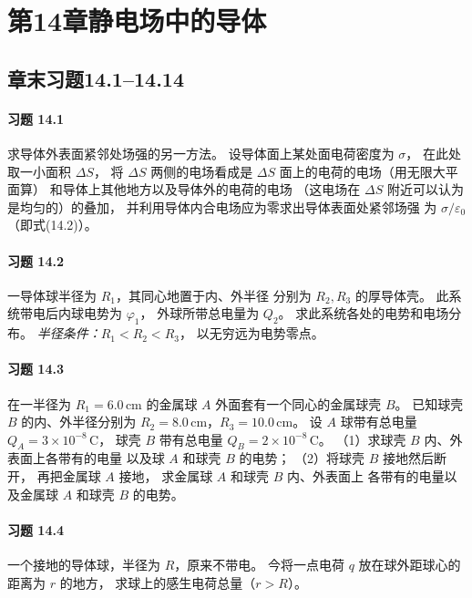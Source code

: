 \section*{第14章\quad 静电场中的导体}
\subsection*{章末习题14.1--14.14}

\paragraph{习题 14.1}
求导体外表面紧邻处场强的另一方法。
设导体面上某处面电荷密度为 \(\sigma\)，
在此处取一小面积 \(\Delta S\)，
将 \(\Delta S\) 两侧的电场看成是
\(\Delta S\) 面上的电荷的电场（用无限大平面算）
和导体上其他地方以及导体外的电荷的电场
（这电场在 \(\Delta S\) 附近可以认为是均匀的）的叠加，
并利用导体内合电场应为零求出导体表面处紧邻场强
为 \(\sigma/\varepsilon_0\)
（即式(14.2)）。

\paragraph{习题 14.2}
一导体球半径为 \(R_1\)，其同心地置于内、外半径
分别为 \(R_2,R_3\) 的厚导体壳。
此系统带电后内球电势为 \(\varphi_1\)，
外球所带总电量为 \(Q_2\)。
求此系统各处的电势和电场分布。
\textit{半径条件：}\(R_1<R_2<R_3\)，
以无穷远为电势零点。

\paragraph{习题 14.3}
在一半径为 \(R_1=6.0\,\mathrm{cm}\) 的金属球
\(A\) 外面套有一个同心的金属球壳 \(B\)。
已知球壳 \(B\) 的内、外半径分别为
\(R_2=8.0\,\mathrm{cm}\)，\(R_3=10.0\,\mathrm{cm}\)。
设 \(A\) 球带有总电量
\(Q_A=3\times10^{-8}\,\mathrm C\)，
球壳 \(B\) 带有总电量
\(Q_B=2\times10^{-8}\,\mathrm C\)。
（1）求球壳 \(B\) 内、外表面上各带有的电量
以及球 \(A\) 和球壳 \(B\) 的电势；
（2）将球壳 \(B\) 接地然后断开，
再把金属球 \(A\) 接地，
求金属球 \(A\) 和球壳 \(B\) 内、外表面上
各带有的电量以及金属球 \(A\) 和球壳 \(B\) 的电势。

\paragraph{习题 14.4}
一个接地的导体球，半径为 \(R\)，原来不带电。
今将一点电荷 \(q\) 放在球外距球心的距离为 \(r\) 的地方，
求球上的感生电荷总量（\(r>R\)）。

